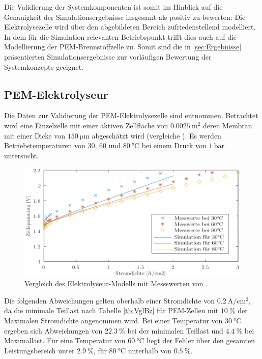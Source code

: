 Die Validierung der Systemkomponenten ist somit im Hinblick auf die Genauigkeit der Simulationsergebnisse insgesamt als positiv zu bewerten: Die Elektrolysezelle wird über den abgebildeten Bereich zufriedenstellend modelliert. In dem für die Simulation relevanten Betriebspunkt trifft dies auch auf die Modellierung der PEM-Brennstoffzelle zu. Somit sind die in \ref{sec:Ergebnisse} präsentierten Simulationsergebnisse zur vorläufigen Bewertung der Systemkonzepte geeignet.

\subsection{PEM-Elektrolyseur}
Die Daten zur Validierung der PEM-Elektrolysezelle sind \citet[S. 36]{tjarks_pem-elektrolyse-systeme_2017} entnommen. Betrachtet wird eine Einzelzelle mit einer aktiven Zellfläche von $\SI{0,0025}{\m\squared}$ deren Membran mit einer Dicke von $\SI{150}{\micro\m}$ abgeschätzt wird (vergleiche \citet{rashid_hydrogen_2015}).
Es werden Betriebstemperaturen von $30$, $60$ und $\SI{80}{\degreeCelsius}$ bei einem Druck von $\SI{1}{\bar}$ untersucht.\\

\begin{figure}[h]
	\centering
		\includegraphics[scale=1]{Figures/ValidierungPEMEC}
		\caption{Vergleich des Elektrolyseur-Modells mit Messswerten von \citet{tjarks_pem-elektrolyse-systeme_2017}.}
\label{fig:ValPEMEC}	
\end{figure}

Die folgenden Abweichungen gelten oberhalb einer Stromdichte von $\SI{0,2}{\A\per\cm\squared}$, da die minimale Teillast nach Tabelle \ref{tb:VglBz} für PEM-Zellen mit $\SI{10}{\%}$ der Maximalen Stromdichte angenommen wird. Bei einer Temperatur von $\SI{30}{\degreeCelsius}$ ergeben sich Abweichungen von  $\SI{22,3}{\%}$ bei der minimalen Teillast und $\SI{4,4}{\%}$ bei Maximallast. 
Für eine Temperatur von  $\SI{60}{\degreeCelsius}$ liegt der Fehler über den gesamten Leistungsbereich unter $\SI{2,9}{\%}$, für $\SI{80}{\degreeCelsius}$ unterhalb von $\SI{0,5}{\%}$.\\

